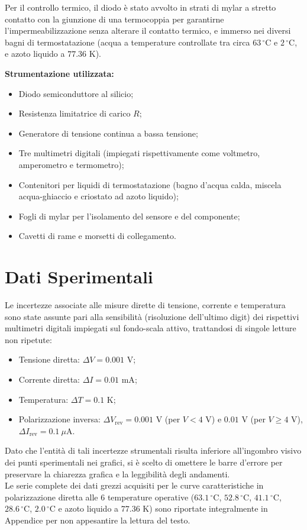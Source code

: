 \documentclass[a4paper,11pt]{article}
\begin{document}
Per il controllo termico, il diodo è stato avvolto in strati di mylar a stretto contatto con la giunzione di una termocoppia per garantirne l'impermeabilizzazione senza alterare il contatto termico, e immerso nei diversi bagni di termostatazione (acqua a temperature controllate tra circa $63\,^\circ\text{C}$ e $2\,^\circ\text{C}$, e azoto liquido a $77.36\text{ K}$).

\textbf{Strumentazione utilizzata:}
\begin{itemize}
    \item Diodo semiconduttore al silicio;
    \item Resistenza limitatrice di carico $R$;
    \item Generatore di tensione continua a bassa tensione;
    \item Tre multimetri digitali (impiegati rispettivamente come voltmetro, amperometro e termometro);
    \item Contenitori per liquidi di termostatazione (bagno d'acqua calda, miscela acqua-ghiaccio e criostato ad azoto liquido);
    \item Fogli di mylar per l'isolamento del sensore e del componente;
    \item Cavetti di rame e morsetti di collegamento.
\end{itemize}

\section{Dati Sperimentali}
Le incertezze associate alle misure dirette di tensione, corrente e temperatura sono state assunte pari alla sensibilità (risoluzione dell'ultimo digit) dei rispettivi multimetri digitali impiegati sul fondo-scala attivo, trattandosi di singole letture non ripetute:
\begin{itemize}
    \item Tensione diretta: $\Delta V = 0.001\text{ V}$;
    \item Corrente diretta: $\Delta I = 0.01\text{ mA}$;
    \item Temperatura: $\Delta T = 0.1\text{ K}$;
    \item Polarizzazione inversa: $\Delta V_{\text{rev}} = 0.001\text{ V}$ (per $V < 4\text{ V}$) e $0.01\text{ V}$ (per $V \ge 4\text{ V}$), $\Delta I_{\text{rev}} = 0.1\ \mu\text{A}$.
\end{itemize}

Dato che l'entità di tali incertezze strumentali risulta inferiore all'ingombro visivo dei punti sperimentali nei grafici, si è scelto di omettere le barre d'errore per preservare la chiarezza grafica e la leggibilità degli andamenti. \\
Le serie complete dei dati grezzi acquisiti per le curve caratteristiche in polarizzazione diretta alle 6 temperature operative ($63.1\,^\circ\text{C}$, $52.8\,^\circ\text{C}$, $41.1\,^\circ\text{C}$, $28.6\,^\circ\text{C}$, $2.0\,^\circ\text{C}$ e azoto liquido a $77.36\text{ K}$) sono riportate integralmente in Appendice per non appesantire la lettura del testo.
\end{document}
